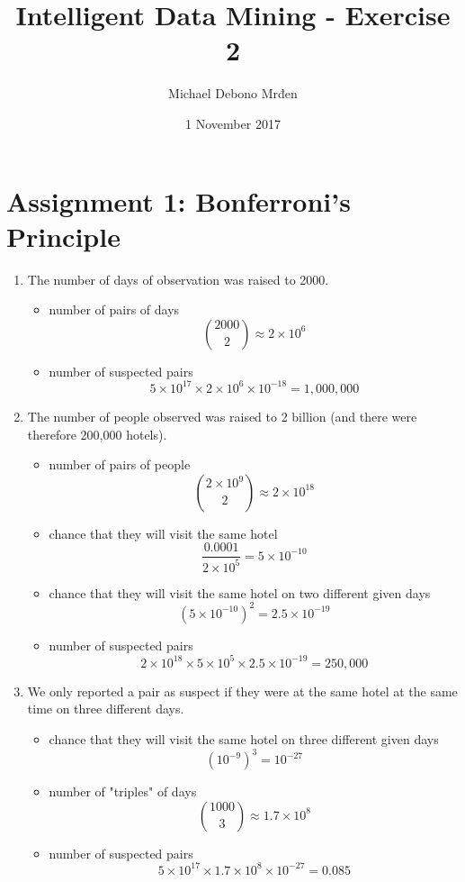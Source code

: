 \documentclass{article}
\title{Intelligent Data Mining - Exercise 2}
\author{Michael Debono Mrđen}
\date{1 November 2017}
\begin{document}
\maketitle

\section{Assignment 1: Bonferroni's Principle}
\renewcommand{\labelenumi}{\alph{enumi}.}
\renewcommand{\labelenumii}{(\alph{enumii})}
\begin{enumerate}
\item{The number of days of observation was raised to 2000.
\begin{itemize}
\item{number of pairs of days
\[ \binom{2000}{2} \approx 2 \times 10^6 \]}
\item{number of suspected pairs
\[ 5 \times 10^{17} \times 2 \times 10^6 \times 10^{-18} = 1,000,000 \]}
\end{itemize}
}

\item{The number of people observed was raised to 2 billion (and there were therefore 200,000 hotels).
\begin{itemize}
\item{number of pairs of people
\[ \binom{2 \times 10^9}{2} \approx 2 \times 10^{18} \]}
\item{chance that they will visit the same hotel
\[ \frac{0.0001}{2 \times 10^5} = 5 \times 10^{-10} \]}
\item{chance that they will visit the same hotel on two different given days
\[ (5 \times 10^{-10})^2 = 2.5 \times 10^{-19} \]}
\item{number of suspected pairs
\[ 2 \times 10^{18} \times 5 \times 10^5 \times 2.5 \times 10^{-19} = 250,000 \]}
\end{itemize}
}

\item{We only reported a pair as suspect if they were at the same hotel at the same time on three different days.
\begin{itemize}
\item{chance that they will visit the same hotel on three different given days
\[ (10^{-9})^3 = 10^{-27} \]}
\item{number of "triples" of days
\[ \binom{1000}{3} \approx 1.7 \times 10^8 \]}
\item{number of suspected pairs
\[ 5 \times 10^{17} \times 1.7 \times 10^8 \times 10^{-27} = 0.085 \]}
\end{itemize}
}
\end{enumerate}
\end{document}
